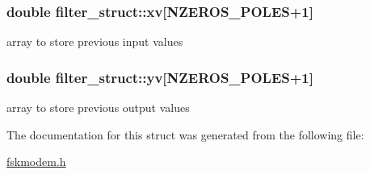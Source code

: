 \subsubsection[{xv}]{\setlength{\rightskip}{0pt plus 5cm}double filter\+\_\+struct\+::xv\mbox{[}{\bf N\+Z\+E\+R\+O\+S\+\_\+\+P\+O\+L\+E\+S}+1\mbox{]}}\label{structfilter__struct_a2e543e657138b4849b87c35ad84e6cf4}


array to store previous input values 

\hypertarget{structfilter__struct_a37b2cc0e29d911e039c4fbd8dc7cd4b7}{}
\subsubsection[{yv}]{\setlength{\rightskip}{0pt plus 5cm}double filter\+\_\+struct\+::yv\mbox{[}{\bf N\+Z\+E\+R\+O\+S\+\_\+\+P\+O\+L\+E\+S}+1\mbox{]}}\label{structfilter__struct_a37b2cc0e29d911e039c4fbd8dc7cd4b7}


array to store previous output values 



The documentation for this struct was generated from the following file\+:\begin{DoxyCompactItemize}
\item 
\hyperlink{fskmodem_8h}{fskmodem.\+h}\end{DoxyCompactItemize}
